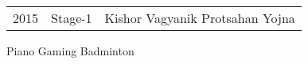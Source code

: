 \documentclass[]{limos-resume-openfont}
\begin{document}
\begin{minipage}[t]{0.66\textwidth}
\begin{tabular}{rll}

2015     & Stage-1  & Kishor Vagyanik Protsahan Yojna \\
\end{tabular}
\sectionsep


% 
% 

Piano \textbullet{} Gaming \textbullet{} Badminton\\
\sectionsep


\end{minipage} 
\end{document}
